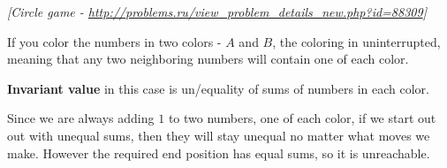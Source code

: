 \begin{problem}
\textit{[Circle game - \url{http://problems.ru/view_problem_details_new.php?id=88309}]}

If you color the numbers in two colors - $A$ and $B$, the coloring in uninterrupted, meaning that any two neighboring numbers will contain one of each color.

\textbf{Invariant value} in this case is un/equality of sums of numbers in each color. 

Since we are always adding $1$ to two numbers, one of each color, if we start out out with unequal sums, then they will stay unequal no matter what moves we make. However the required end position has equal sums, so it is unreachable.
\end{problem}
%




